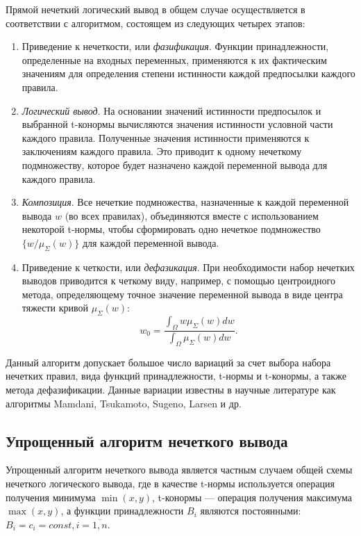 Прямой нечеткий логический вывод в общем случае осуществляется в
соответствии с алгоритмом, состоящем из следующих четырех этапов:
\begin{enumerate}
\item Приведение к нечеткости, или \emph{фазификация}.
  Функции принадлежности, определенные на входных переменных,
  применяются к их фактическим значениям для определения степени
  истинности каждой предпосылки каждого правила.
\item \emph{Логический вывод}.
  На основании значений истинности предпосылок и выбранной t-конормы вычисляются
  значения истинности условной части каждого правила.
  Полученные значения истинности применяются к заключениям каждого правила.
  Это приводит к одному нечеткому подмножеству, которое будет назначено
  каждой переменной вывода для каждого правила.
\item \emph{Композиция}.
  Все нечеткие подмножества, назначенные к каждой переменной вывода \( w \)
  (во всех правилах), объединяются вместе с использованием некоторой t-нормы,
  чтобы сформировать одно нечеткое подмножество \( \{ w / \mu_{\Sigma}(w) \}\)
  для каждой переменной вывода.
\item Приведение к четкости, или \emph{дефазикация}.
  При необходимости набор нечетких выводов приводится к четкому виду,
  например, с помощью центроидного метода, определяющему точное значение переменной вывода
  в виде центра тяжести кривой \( \mu_{\Sigma}(w) \):
  \[
    w_0 = \dfrac{\int_{\Omega} w \mu_{\Sigma}(w) dw}{\int_{\Omega} \mu_{\Sigma}(w) dw}.
  \]
\end{enumerate}

Данный алгоритм допускает большое число вариаций за счет выбора
набора нечетких правил, вида функций принадлежности, t-нормы и t-конормы,
а также метода дефазификации.
Данные вариации известны в научные литературе как
алгоритмы Mamdani, Tsukamoto, Sugeno, Larsen и др.

\pagebreak

\subsection{Упрощенный алгоритм нечеткого вывода}

Упрощенный алгоритм нечеткого вывода является частным случаем
общей схемы нечеткого логического вывода,
где в качестве t-нормы используется операция получения минимума \( \min(x, y) \),
t-конормы --- операция получения максимума \( \max(x, y) \),
а функции принадлежности \( B_i \) являются постоянными:
\( B_i = c_i = const, i = \overline{1, n} \).

